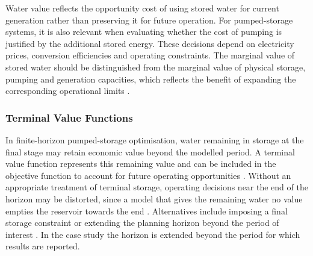 Water value reflects the opportunity cost of using stored water for current generation rather than preserving it for future operation. For pumped-storage systems, it is also relevant when evaluating whether the cost of pumping is justified by the additional stored energy. These decisions depend on electricity prices, conversion efficiencies and operating constraints. The marginal value of stored water should be distinguished from the marginal value of physical storage, pumping and generation capacities, which reflects the benefit of expanding the corresponding operational limits \parencite{horsleyWrobel2002}.

\subsubsection{Terminal Value Functions}
In finite-horizon pumped-storage optimisation, water remaining in storage at the final stage may retain economic value beyond the modelled period. A terminal value function represents this remaining value and can be included in the objective function to account for future operating opportunities \parencite{tilmant2008}. Without an appropriate treatment of terminal storage, operating decisions near the end of the horizon may be distorted, since a model that gives the remaining water no value empties the reservoir towards the end \parencite{kleiven2023}. Alternatives include imposing a final storage constraint \parencite{chazarra2017} or extending the planning horizon beyond the period of interest \parencite{helseth2016}. In the case study the horizon is extended beyond the period for which results are reported.
